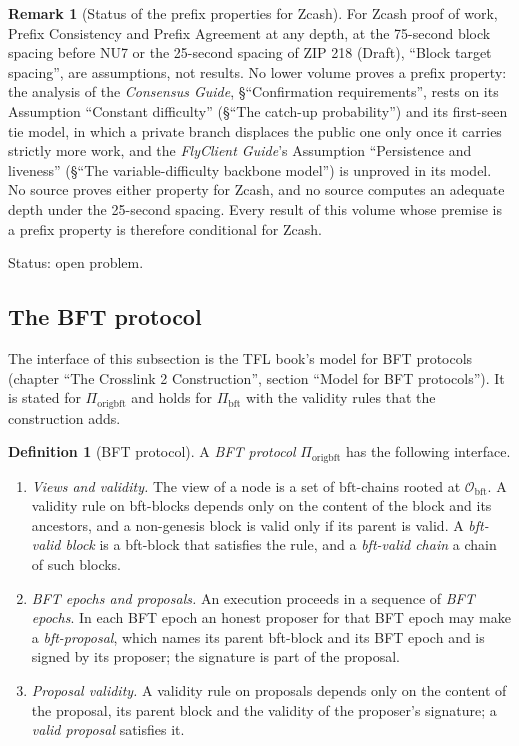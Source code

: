 \documentclass[11pt,a4paper]{article}
\theoremstyle{definition}
\newtheorem{definition}[theorem]{Definition}
\newtheorem{remark}[theorem]{Remark}
\newcommand{\bft}{\mathrm{bft}}
\newcommand{\Origin}{\mathcal{O}}
\newcommand{\Obft}{\Origin_{\bft}}
\newcommand{\Piorigbft}{\Pi_{\mathrm{origbft}}}
\newcommand{\Pibft}{\Pi_{\bft}}
\begin{document}
\begin{remark}[Status of the prefix properties for Zcash]\label{rem:pow-prefix}
For Zcash proof of work, Prefix Consistency and Prefix Agreement at any
depth, at the 75-second block spacing before NU7 or the 25-second spacing of
ZIP 218 (Draft), ``Block target spacing'', are assumptions, not results. No
lower volume proves a prefix property: the analysis of the \emph{Consensus
Guide}, \S``Confirmation requirements'', rests on its Assumption ``Constant
difficulty'' (\S``The catch-up probability'') and its first-seen tie model,
in which a private branch displaces the public one only once it carries
strictly more work, and the \emph{FlyClient Guide}'s Assumption ``Persistence
and liveness'' (\S``The variable-difficulty backbone model'') is unproved in its
model. No source proves either property for Zcash, and no source computes an
adequate depth under the 25-second spacing. Every result of this volume whose
premise is a prefix property is therefore conditional for Zcash.

Status: open problem.
\end{remark}

\subsection{The BFT protocol}\label{sec:iface-bft}

The interface of this subsection is the TFL book's model for BFT protocols
(chapter ``The Crosslink 2 Construction'', section ``Model for BFT
protocols''). It is stated for $\Piorigbft$ and holds for $\Pibft$ with the
validity rules that the construction adds.

\begin{definition}[BFT protocol]\label{def:bft-protocol}
A \emph{BFT protocol} $\Piorigbft$ has the following interface.
\begin{enumerate}[label=(\roman*)]
\item \emph{Views and validity.} The view of a node is a set of
  $\bft$-chains rooted at $\Obft$. A validity rule on bft-blocks depends only
  on the content of the block and its ancestors, and a non-genesis block is
  valid only if its parent is valid. A \emph{bft-valid block} is a bft-block
  that satisfies the rule, and a \emph{bft-valid chain} a chain of such
  blocks.
\item \emph{BFT epochs and proposals.} An execution proceeds in a sequence of
  \emph{BFT epochs}. In each BFT epoch an honest proposer for that BFT epoch
  may make a \emph{bft-proposal}, which names its parent bft-block and its BFT
  epoch and is signed by its proposer; the signature is part of the proposal.
\item \emph{Proposal validity.} A validity rule on proposals depends only on
  the content of the proposal, its parent block and the validity of the
  proposer's signature; a \emph{valid proposal} satisfies it.
\end{enumerate}
\end{definition}
\end{document}
